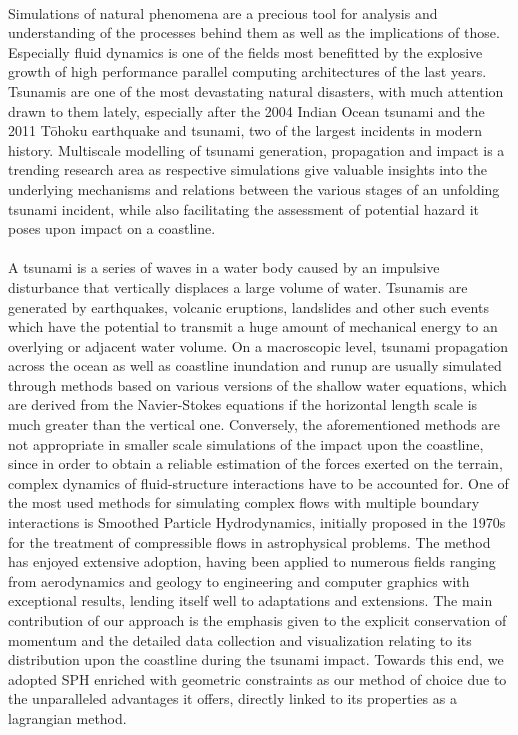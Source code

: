 \documentclass{llncs}
\begin{document}
\paragraph{} Simulations of natural phenomena are a precious tool for analysis and
understanding of the processes behind them as well as the implications of
those. Especially fluid dynamics is one of the fields most benefitted by the explosive
growth of high performance parallel computing architectures of the last years. Tsunamis
are one of the most devastating natural disasters, with much attention drawn to them
lately, especially after the 2004 Indian Ocean tsunami and the 2011 T\={o}hoku earthquake
and tsunami, two of the largest incidents in modern history. Multiscale modelling of
tsunami generation, propagation and impact is a trending research area as respective
simulations give valuable insights into the underlying mechanisms and relations between
the various stages of an unfolding tsunami incident, while also facilitating the
assessment of potential hazard it poses upon impact on a coastline.

\paragraph{} A tsunami is a series of waves in a water body caused by an impulsive
disturbance that vertically displaces a large volume of water. Tsunamis are generated by
earthquakes, volcanic eruptions, landslides and other such events which have the potential
to transmit a huge amount of mechanical energy to an overlying or adjacent water
volume. On a macroscopic level, tsunami propagation across the ocean as well as coastline
inundation and runup are usually simulated through methods based on various versions of
the shallow water equations, which are derived from the Navier-Stokes equations if the
horizontal length scale is much greater than the vertical one. Conversely, the
aforementioned methods are not appropriate in smaller scale simulations of the impact upon
the coastline, since in order to obtain a reliable estimation of the forces exerted on the
terrain, complex dynamics of fluid-structure interactions have to be accounted for. One of
the most used methods for simulating complex flows with multiple boundary interactions is
Smoothed Particle Hydrodynamics, initially proposed in the 1970s for the treatment of
compressible flows in astrophysical problems. The method has enjoyed extensive adoption,
having been applied to numerous fields ranging from aerodynamics and geology to
engineering and computer graphics with exceptional results, lending itself well to
adaptations and extensions. The main contribution of our approach is the emphasis given to
the explicit conservation of momentum and the detailed data collection and visualization
relating to its distribution upon the coastline during the tsunami impact. Towards this
end, we adopted SPH enriched with geometric constraints as our method of choice due to the
unparalleled advantages it offers, directly linked to its properties as a lagrangian
method.
\end{document}

